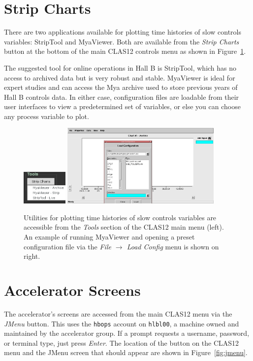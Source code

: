 \documentclass[amsmath,amssymb,notitlepage,11pt]{revtex4}
\begin{document}
\section{Strip Charts}
There are two applications available for plotting time histories of slow controls variables:  StripTool and MyaViewer.  Both are available from the {\em Strip Charts} button at the bottom of the main CLAS12 controls menu as shown in Figure~\ref{fig:strips}.

The suggested tool for online operations in Hall B is StripTool, which has no access to archived data but is very robust and stable.  MyaViewer is ideal for expert studies and can access the Mya archive used to store previous years of Hall B controls data.  In either case, configuration files are loadable from their user interfaces to view a predetermined set of variables, or else you can choose any process variable to plot.

\begin{figure}[htbp]\centering
    \includegraphics[width=0.2\textwidth]{pics/strips}
    \includegraphics[width=0.7\textwidth]{pics/myaviewer}
    \caption{Utilities for plotting time histories of slow controls variables are accessible from the {\em Tools} section of the CLAS12 main menu (left).  An example of running MyaViewer and opening a preset configuration file via the {\em File $\rightarrow$ Load Config} menu is shown on right.\label{fig:strips}}
\end{figure}

\newpage

\section{Accelerator Screens}
The accelerator's screens are accessed from the main CLAS12 menu via the {\em JMenu} button.  This uses the \texttt{hbops} account on \texttt{hlbl00}, a machine owned and maintained by the accelerator group.  If a prompt requests a username, password, or terminal type, just press {\em Enter}.  The location of the button on the CLAS12 menu and the JMenu screen that should appear are shown in Figure~\ref{fig:jmenu}.
\end{document}
